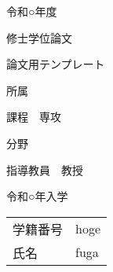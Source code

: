 \documentclass[main]{subfiles}
\begin{document}
\begin{titlepage}
    \centering

    {\Huge 令和○年度}
    \vspace{15truept}

    {\Huge 修士学位論文}
    \vspace*{60truept}

    {\Huge 論文用テンプレート}
    \vspace{60truept}

    {\Huge 所属}
    \vspace{15truept}

    {\Huge 課程　専攻}
    \vspace{15truept}

    {\Huge 分野}
    \vspace{60truept}

    {\Huge 指導教員　教授}
    \vspace{60truept}

    {\Huge 令和○年入学}
    \vspace{15truept}

    \Huge
    \begin{tabular}{ll}
        学籍番号&hoge\\
        氏名&fuga\\
    \end{tabular}

\end{titlepage}
\end{document}

